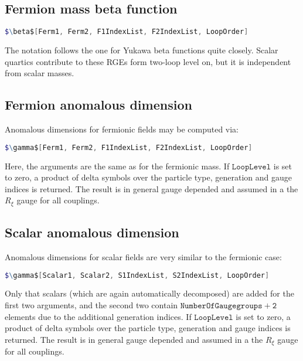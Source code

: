 \documentclass{scrartcl}
\begin{document}
\subsection{Fermion mass beta function}
\begin{lstlisting}[language=mathematica,mathescape,columns=flexible,backgroundcolor=\color{light-gray}]
$\beta$[Ferm1, Ferm2, F1IndexList, F2IndexList, LoopOrder]
\end{lstlisting}
The notation follows the one for Yukawa beta functions quite closely. Scalar quartics contribute to these RGEs form two-loop level on, but it is independent from scalar masses. \\
\subsection{Fermion anomalous dimension}
Anomalous dimensions for fermionic fields may be computed via:
\begin{lstlisting}[language=mathematica,mathescape,columns=flexible,backgroundcolor=\color{light-gray}]
$\gamma$[Ferm1, Ferm2, F1IndexList, F2IndexList, LoopOrder]
\end{lstlisting}
Here, the arguments are the same as for the fermionic mass. If $\mathtt{LoopLevel}$ is set to zero, a product of delta symbols over the particle type, generation and gauge indices is returned. The result is in general gauge depended and assumed in a the $R_\xi$ gauge for all couplings. \\ \FloatBarrier
\subsection{Scalar anomalous dimension}
Anomalous dimensions for scalar fields are very similar to the fermionic case:
\begin{lstlisting}[language=mathematica,mathescape,columns=flexible,backgroundcolor=\color{light-gray}]
$\gamma$[Scalar1, Scalar2, S1IndexList, S2IndexList, LoopOrder]
\end{lstlisting}
Only that scalars (which are again automatically decomposed) are added for the first two arguments, and the second two contain $\mathtt{NumberOfGaugegroups+2}$ elements due to the additional generation indices. If $\mathtt{LoopLevel}$ is set to zero, a product of delta symbols over the particle type, generation and gauge indices is returned. The result is in general gauge depended and assumed in a the $R_\xi$ gauge for all couplings. \\ \FloatBarrier
\newpage
\end{document}
